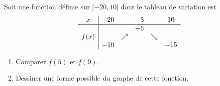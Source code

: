
\begin{exercice}\label{exosmath-0209}

    Soit une fonction définie sur \( \mathopen[ -20 , 10 \mathclose]\) dont le tableau de variation est
\begin{equation*}
    \begin{array}[]{c|ccccc}
        x&-20&&-3&&10\\
        \hline
        &&&-6&&\\
        f(x)&&\nearrow&&\searrow&\\
        &-10&&&&-15
    \end{array}
\end{equation*}
\begin{enumerate}
    \item
Comparer \( f(5)\) et \( f(9)\).
\item
    Dessiner une forme possible du graphe de cette fonction.
\end{enumerate}

\end{exercice}
